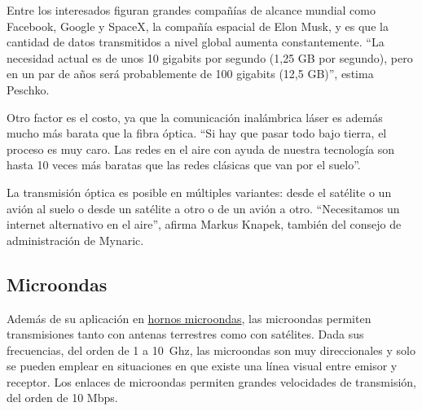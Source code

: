 \documentclass[a4paper]{article}
\begin{document}
Entre los interesados figuran grandes compañías de alcance mundial como
Facebook, Google y SpaceX, la compañía espacial de Elon Musk, y es que
la cantidad de datos transmitidos a nivel global aumenta constantemente.
``La necesidad actual es de unos 10 gigabits por segundo (1,25 GB por
segundo), pero en un par de años será probablemente de 100 gigabits
(12,5 GB)'', estima Peschko.

\noindent{}

Otro factor es el costo, ya que la comunicación inalámbrica láser es
además mucho más barata que la fibra óptica. ``Si hay que pasar todo
bajo tierra, el proceso es muy caro. Las redes en el aire con ayuda de
nuestra tecnología son hasta 10 veces más baratas que las redes clásicas
que van por el suelo''.

La transmisión óptica es posible en múltiples variantes: desde el
satélite o un avión al suelo o desde un satélite a otro o de un avión a
otro. ``Necesitamos un internet alternativo en el aire'', afirma Markus
Knapek, también del consejo de administración de Mynaric.

\subsection{Microondas}

Además de su aplicación
en \href{https://es.wikipedia.org/wiki/Horno_microondas}{hornos
microondas}, las microondas permiten transmisiones tanto con antenas
terrestres como con satélites. Dada sus frecuencias, del orden de 1 a
10~Ghz, las microondas son muy direccionales y solo se pueden emplear en
situaciones en que existe una línea visual entre emisor y receptor. Los
enlaces de microondas permiten grandes velocidades de transmisión, del
orden de 10 Mbps.
\end{document}
